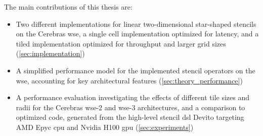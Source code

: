The main contributions of this thesis are:
\begin{itemize}
    \item Two different implementations for linear two-dimensional star-shaped stencils on the Cerebras \ac{wse}, a single cell implementation optimized for latency, and a tiled implementation optimized for throughput and larger grid sizes (\autoref{sec:implementation})
    \item A simplified performance model for the implemented stencil operators on the \ac{wse}, accounting for key architectural features (\autoref{sec:theory_performance})
    \item A performance evaluation investigating the effects of different tile sizes and radii for the Cerebras \ac{wse}-2 and \ac{wse}-3 architectures, and a comparison to optimized code, generated from the high-level stencil \ac{dsl} Devito targeting AMD Epyc \ac{cpu} and Nvidia H100 \ac{gpu} (\autoref{sec:experiments})
\end{itemize}
